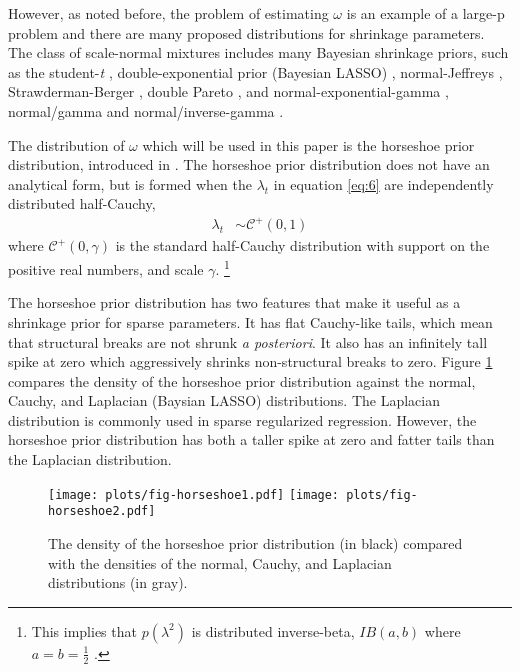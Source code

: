 \documentclass{article}
\newcommand{\paren}[1]{\ensuremath{\left(#1\right)}}
\newcommand{\dhalfcauchy}[1]{\ensuremath{\mathcal{C}^{+}\paren{#1}}}
\begin{document}
However, as noted before, the problem of estimating $\omega$ is an example of a large-p problem and there are many proposed distributions for shrinkage parameters.
The class of scale-normal mixtures includes many Bayesian shrinkage priors, such as the student-\textit{t} \parencite{Tipping2001}, double-exponential prior (Bayesian LASSO) \parencites{LiGoel2006}{ParkCasella2008}{Hans2009}, normal-Jeffreys \parencites{FigueiredoMember2003}{BaeMallick2004}, Strawderman-Berger \parencites{Strawderman1971}{Berger1980}, double Pareto \parencite{ArmaganDunsonLee2011},  and normal-exponential-gamma \parencite{BrownGriffin2005}, normal/gamma and normal/inverse-gamma \parencites{CaronDoucet2008}{BrownGriffin2010}.

The distribution of $\omega$ which will be used in this paper is the horseshoe prior distribution, introduced in \textcites{CarvalhoPolsonScott2009}{CarvalhoPolsonScott2010}.
The horseshoe prior distribution does not have an analytical form, but is formed when the $\lambda_{t}$ in equation \eqref{eq:6} are independently distributed half-Cauchy,
\begin{align}
  \label{eq:13}
  \lambda_{t} &\sim \dhalfcauchy{0, 1}
\end{align}
where $\dhalfcauchy{0, \gamma}$ is the standard half-Cauchy distribution with support on the positive real numbers, and scale $\gamma$.%
\footnote{
  This implies that $p(\lambda^{2})$ is distributed inverse-beta, $IB(a, b)$ where $a = b = \frac{1}{2}$ \parencite[4]{PolsonScott2010}. 
}

The horseshoe prior distribution has two features that make it useful as a shrinkage prior for sparse parameters.
It has flat Cauchy-like tails, which mean that structural breaks are not shrunk \textit{a posteriori}.
It also has an infinitely tall spike at zero which aggressively shrinks non-structural breaks to zero.
Figure \ref{fig:horseshoe} compares the density of the horseshoe prior distribution against the normal, Cauchy, and Laplacian (Baysian LASSO) distributions.
The Laplacian distribution is commonly used in sparse regularized regression.
However, the horseshoe prior distribution has both a taller spike at zero and fatter tails than the Laplacian distribution.

\begin{figure}
  \centering
  \texttt{[image: plots/fig-horseshoe1.pdf]}
  \texttt{[image: plots/fig-horseshoe2.pdf]}
  \caption{The density of the horseshoe prior distribution (in black) compared with the densities of the normal, Cauchy, and Laplacian distributions (in gray).}
  \label{fig:horseshoe}
\end{figure}
\end{document}
